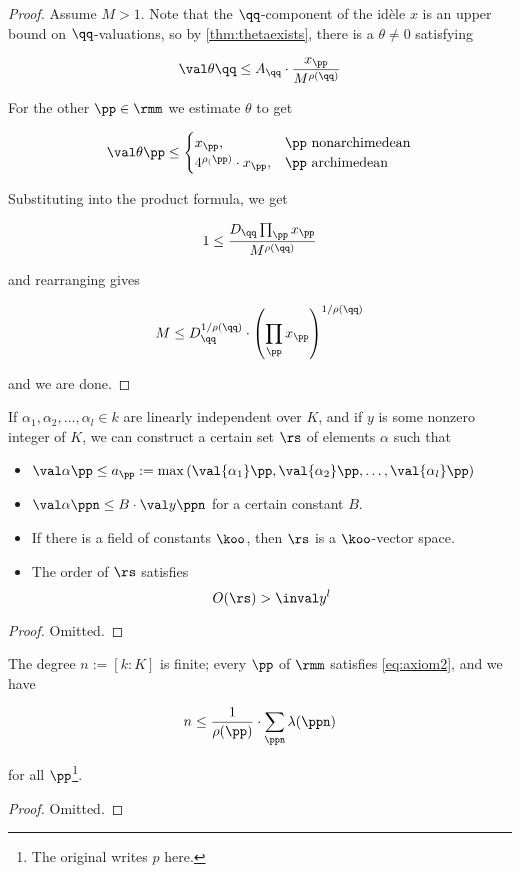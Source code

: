 \begin{proof}
  Assume $M>1$. Note that the $\qq$-component of the id\`ele $x$ is an upper
  bound on $\qq$-valuations, so by \ref{thm:thetaexists}, there is a $\theta\neq
  0$ satisfying

  \[ \val\theta\qq \leq A_\qq \cdot \frac {x_\pp}{M^{\rho(\qq)}} \]

  For the other $\pp\in\rmm$ we estimate $\theta$ to get

  \[
    \val\theta\pp \leq
    \begin{cases}
      x_\pp, &\pp \text{ nonarchimedean}\\
      4^{\rho_(\pp)}\cdot x_\pp, &\pp \text{ archimedean}
    \end{cases}
  \]

  Substituting into the product formula, we get

  \[ 1\leq \frac{D_\qq \prod_\pp x_\pp}{M^{\rho(\qq)}} \]

  and rearranging gives

  \[ M \leq { D_\qq^{1/\rho(\qq)} } \cdot {\left( \prod_\pp x_\pp \right)}^{1/\rho(\qq)} \]

  and we are done.

\end{proof}

\begin{lemma}
  If $\alpha_1,\alpha_2,\ldots,\alpha_l\in k$ are linearly independent over $K$,
  and if $y$ is some nonzero integer of $K$, we can construct a certain set $\rs$
  of elements $\alpha$ such that

  \begin{itemize}
  \item $\val\alpha\pp\leq a_\pp := \max\left( \val{\alpha_1}\pp,\val{\alpha_2}\pp,\ldots,\val{\alpha_l}\pp\right)$
  \item $\val\alpha\ppn \leq B\cdot\val y\ppn$ for a certain constant $B$.
  \item If there is a field of constants $\koo$, then $\rs$ is a $\koo$-vector space.
  \item The order of $\rs$ satisfies
    \[ O({\rs}) > \inval y ^l \]
  \end{itemize}
\end{lemma}
\begin{proof}
  Omitted.
\end{proof}

\begin{lemma}
  The degree $n := [k:K]$ is finite; every $\pp$ of $\rmm$ satisfies
  \ref{eq:axiom2}, and we have

  \[ n \leq \frac1{\rho(\pp)} \cdot \sum_{\ppn}\lambda(\ppn) \]

  for all $\pp$\footnote{The original writes $p$ here.}.
\end{lemma}
\begin{proof}
  Omitted.
\end{proof}

